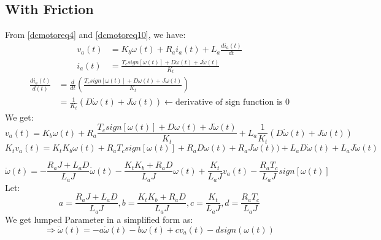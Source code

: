 \subsection{With Friction}
From \autoref{dcmotoreq4} and \autoref{dcmotoreq10}, we have:
\[\begin{split}
	v_a(t) &= K_b \omega(t) + R_a i_a(t) + L_a \frac{di_a(t)}{dt} \\
	i_a(t) &= \frac{T_c sign[\omega(t)] +D\omega(t) + J \dot{\omega}(t)}{K_t}
\end{split}\]
\[\begin{split}
	\frac{di_a(t)}{d(t)} &= \frac{d}{dt}\left(\frac{T_c sign[\omega(t)] +D\omega(t) + J \dot{\omega}(t)}{K_t}\right) \\
	&= \frac{1}{K_t} (D\dot{\omega}(t) + J \ddot{\omega}(t)) \leftarrow \text{derivative of sign function is 0}
\end{split}\]
We get:
\begin{equation}
	v_a(t) = K_b \omega(t) + R_a \frac{T_c sign[\omega(t)] + D\omega(t) + J \dot{\omega}(t)}{K_t} + L_a\frac{1}{K_t} (D\dot{\omega}(t) + J \ddot{\omega}(t))
	\label{dcmotoreq17}
\end{equation}
\[
K_tv_a(t) = K_tK_b \omega(t) + R_aT_c sign[\omega(t)] + R_aD\omega(t) + R_aJ \dot{\omega}(t)) + L_a D\dot{\omega}(t) + L_a J \ddot{\omega}(t)
\]

\begin{tcolorbox}[title=Lumped Parameters with Friction 2nd Order]
	\[
	\ddot{\omega}(t) = - \frac{R_a J + L_a D}{L_aJ} \dot{\omega}(t) -\frac{K_tK_b + R_a D}{L_aJ} \omega(t)  + \frac{K_t}{L_aJ}v_a(t) - \frac{R_aT_c}{L_aJ} sign[\omega(t)]
	\]
	Let:
	\[
	a = \frac{R_a J + L_a D}{L_aJ}, b = \frac{K_tK_b + R_a D}{L_aJ}, c = \frac{K_t}{L_aJ}, d = \frac{R_aT_c}{L_aJ}
	\]
	We get lumped Parameter in a simplified form as:
	\begin{equation}
		\Rightarrow \ddot{\omega}(t) = - a\dot{\omega}(t) - b\omega(t) + cv_a(t) - dsign(\omega(t))
		\label{dcmotoreq18}
	\end{equation}
\end{tcolorbox}
